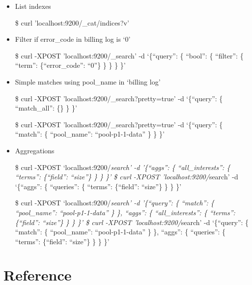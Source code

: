 \documentclass[]{article}
\begin{document}
\begin{itemize}
\item
  List indexes

  \$ curl 'localhost:9200/\_cat/indices?v'
\item
  Filter if error\_code in billing log is `0'

  \$ curl -XPOST 'localhost:9200/\_search' -d `\{``query'': \{ ``bool'':
  \{ ``filter'': \{ ``term'': \{``error\_code'': ``0''\} \} \} \} \}'
\item
  Simple matches using pool\_name in `billing log'

  \$ curl -XPOST 'localhost:9200/\_search?pretty=true' -d `\{``query'':
  \{ ``match\_all'': \{\} \} \}'

  \$ curl -XPOST 'localhost:9200/\_search?pretty=true' -d `\{``query'':
  \{ ``match'': \{ ``pool\_name'': ``pool-p1-1-data'' \} \} \}'
\item
  Aggregations

  \$ curl -XPOST `localhost:9200/\emph{search' -d '\{``aggs'': \{
  ``all\_interests'': \{ ``terms'': \{``field'': ``size''\} \} \} \}' \$
  curl -XPOST 'localhost:9200/}search' -d `\{``aggs'': \{ ``queries'':
  \{ ``terms'': \{``field'': ``size''\} \} \} \}'

  \$ curl -XPOST `localhost:9200/\emph{search' -d '\{``query'': \{
  ``match'': \{ ``pool\_name'': ``pool-p1-1-data'' \} \}, ``aggs'': \{
  ``all\_interests'': \{ ``terms'': \{``field'': ``size''\} \} \} \}' \$
  curl -XPOST 'localhost:9200/}search' -d `\{``query'': \{ ``match'': \{
  ``pool\_name'': ``pool-p1-1-data'' \} \}, ``aggs'': \{ ``queries'': \{
  ``terms'': \{``field'': ``size''\} \} \} \}'
\end{itemize}

\section{Reference}\label{reference}
\end{document}
